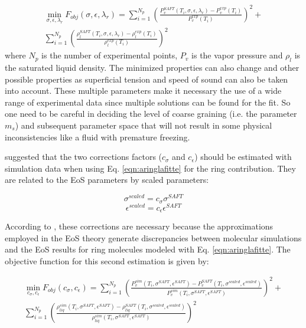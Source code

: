 \begin{equation}
\begin{aligned}
\min\limits_{\sigma,\epsilon,\lambda_{r}} F_{obj}(\sigma,\epsilon,\lambda_{r})= \sum_{i=1}^{N_{p}} \left(\frac{P_{v}^{SAFT}(T_{i},\sigma,\epsilon,\lambda_{r})-P_{v}^{exp}(T_{i})}{P_{v}^{exp}(T_{i})} \right)^2 +\\
 \sum_{i=1}^{N_{p}} \left(\frac{\rho_{l}^{SAFT}(T_{i},\sigma,\epsilon,\lambda_{r})-\rho_{l}^{exp}(T_{i})}{\rho_{l}^{exp}(T_{i})} \right)^2
\end{aligned}
\label{eqn:fobj}
\end{equation}
where $N_{p}$ is the number of experimental points, $P_{v}$ is the vapor pressure and $\rho_{l}$ is the saturated liquid density. The minimized properties can also change and other possible properties as superficial tension and speed of sound can also be taken into account. These multiple parameters make it necessary the use of a wide range of experimental data since multiple solutions can be found for the fit. So one need to be careful in deciding the level of coarse graining (i.e. the parameter $m_{s}$) and subsequent parameter space that will not result in some physical inconsistencies like a fluid with premature freezing.

 suggested that the two corrections factors ($c_{\sigma}$ and $c_{\epsilon}$) should be estimated with simulation data when using Eq. \eqref{eqn:aringlafitte} for the ring contribution. They are related to the EoS parameters by scaled parameters:

\begin{equation}
\sigma^{scaled} = c_{\sigma}\sigma^{SAFT}
\label{eqn:csigma}
\end{equation}
\begin{equation}
\epsilon^{scaled} = c_{\epsilon}\epsilon^{SAFT}
\label{eqn:ceps}
\end{equation}

According to , these corrections are necessary because the approximations employed in the EoS theory generate discrepancies between molecular simulations and the EoS results for ring molecules modeled with Eq. \eqref{eqn:aringlafitte}. The objective function for this second estimation is given by:

\begin{equation}
\begin{split}
\min\limits_{c_{\sigma},c_{\epsilon}} F_{obj}(c_{\sigma},c_{\epsilon})= \sum_{i=1}^{N_{p}} \left(\frac{P_{v}^{sim}(T_{i},\sigma^{SAFT},\epsilon^{SAFT})-P_{v}^{SAFT}(T_{i},\sigma^{scaled},\epsilon^{scaled})}{P_{v}^{sim}(T_{i},\sigma^{SAFT},\epsilon^{SAFT})} \right)^2 + \\
 \sum_{i=1}^{N_{p}} \left(\frac{\rho_{liq}^{sim}(T_{i},\sigma^{SAFT},\epsilon^{SAFT})-\rho_{liq}^{SAFT}(T_{i},\sigma^{scaled},\epsilon^{scaled})}{\rho_{liq}^{sim}(T_{i},\sigma^{SAFT},\epsilon^{SAFT})} \right)^2
\end{split}
\label{eqn:fobjla}
\end{equation}

